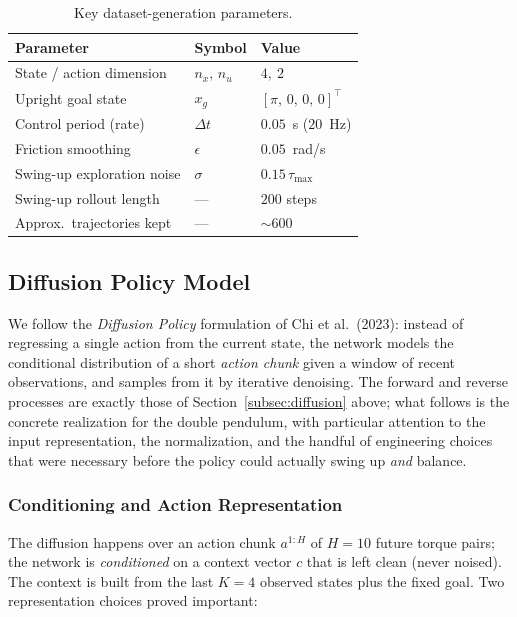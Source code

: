 \documentclass[11pt,a4paper]{article}
\begin{document}
\begin{table}[H]
  \centering
  \caption{Key dataset-generation parameters.}
  \begin{tabular}{@{}lll@{}}
    \toprule
    \textbf{Parameter} & \textbf{Symbol} & \textbf{Value} \\
    \midrule
    State / action dimension      & $n_x,\,n_u$    & $4,\ 2$ \\
    Upright goal state            & $x_g$          & $[\pi,\,0,\,0,\,0]^\top$ \\
    Control period (rate)         & $\Delta t$     & $0.05$~s ($20$~Hz) \\
    Friction smoothing            & $\epsilon$     & $0.05$~rad/s \\
    Swing-up exploration noise    & $\sigma$       & $0.15\,\tau_{\max}$ \\
    Swing-up rollout length       & ---            & $200$ steps \\
    Approx.\ trajectories kept    & ---            & $\sim\!600$ \\
    \bottomrule
  \end{tabular}
\end{table}

\pagebreak

\subsection{Diffusion Policy Model}
We follow the \emph{Diffusion Policy} formulation of Chi et al.\ (2023): instead of
regressing a single action from the current state, the network models the
conditional distribution of a short \emph{action chunk} given a window of recent
observations, and samples from it by iterative denoising. The forward and reverse
processes are exactly those of Section~\ref{subsec:diffusion} above; what follows is the concrete
realization for the double pendulum, with particular attention to the input
representation, the normalization, and the handful of engineering choices that were
necessary before the policy could actually swing up \emph{and} balance.

\subsubsection{Conditioning and Action Representation}
The diffusion happens over an action chunk $a^{1:H}$ of $H = 10$ future torque
pairs; the network is \emph{conditioned} on a context vector $c$ that is left clean
(never noised). The context is built from the last $K = 4$ observed states plus the
fixed goal. Two representation choices proved important:
\end{document}

